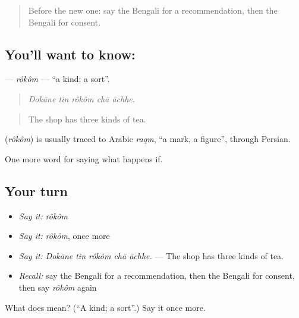 \begin{quote}
Before the new one: say the Bengali for a recommendation, then the Bengali for consent.
\end{quote}

\subsection*{You'll want to know: }
\textbf{} — \emph{rôkôm} — \textquotedblleft{}a kind; a sort\textquotedblright{}.

\begin{quote}
    
\end{quote}

\begin{quote}
\emph{Dokāne tin rôkôm chā āchhe.}
\end{quote}

\begin{quote}
The shop has three kinds of tea.
\end{quote}

\begin{cousinweb}
\textbf{} (\emph{rôkôm}) is usually traced to Arabic \emph{raqm}, \textquotedblleft{}a mark, a figure\textquotedblright{}, through Persian.
\end{cousinweb}

\begin{grammarlens}[title={What you've built}]
One more word for saying what happens if.
\end{grammarlens}

\subsection*{Your turn}
\begin{itemize}
\raggedright
  \item \emph{Say it:} \emph{rôkôm}
  \item \emph{Say it:} \emph{rôkôm}, once more
  \item \emph{Say it:} \emph{Dokāne tin rôkôm chā āchhe.} — The shop has three kinds of tea.
  \item \emph{Recall:} say the Bengali for a recommendation, then the Bengali for consent, then say \emph{rôkôm} again
\end{itemize}

\begin{tcolorbox}[breakable,colback=teal!4,colframe=teal!35!black,title={Before you move on}]
What does  mean? (\textquotedblleft{}A kind; a sort\textquotedblright{}.) Say it once more.
\end{tcolorbox}
